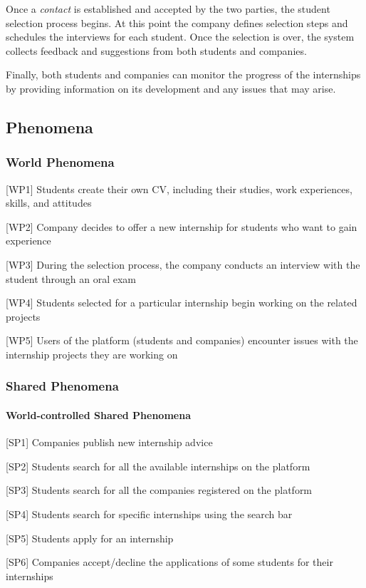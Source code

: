 		Once a \emph{contact} is established and accepted by the two parties, the student selection process begins. At this point the company defines selection steps and schedules the interviews for each student. Once the selection is over, the system collects feedback and suggestions from both students and companies.
		
		Finally, both students and companies can monitor the progress of the internships by providing information on its development and any issues that may arise.
		\subsection{Phenomena}
			\subsubsection{World Phenomena}
				[WP1] Students create their own CV, including their studies, work experiences, skills, and attitudes
				
				[WP2] Company decides to offer a new internship for students who want to gain experience
				
				[WP3] During the selection process, the company conducts an interview with the student through an oral exam
				
				[WP4] Students selected for a particular internship begin working on the related projects
				
				[WP5] Users of the platform (students and companies) encounter issues with the internship projects they are working on
			\subsubsection{Shared Phenomena}
				\paragraph{World-controlled Shared Phenomena}
					[SP1] Companies publish new internship advice
					
					[SP2] Students search for all the available internships on the platform
					
					[SP3] Students search for all the companies registered on the platform
					
					[SP4] Students search for specific internships using the search bar
					
					[SP5] Students apply for an internship
					
					[SP6] Companies accept/decline the applications of some students for their internships
					
